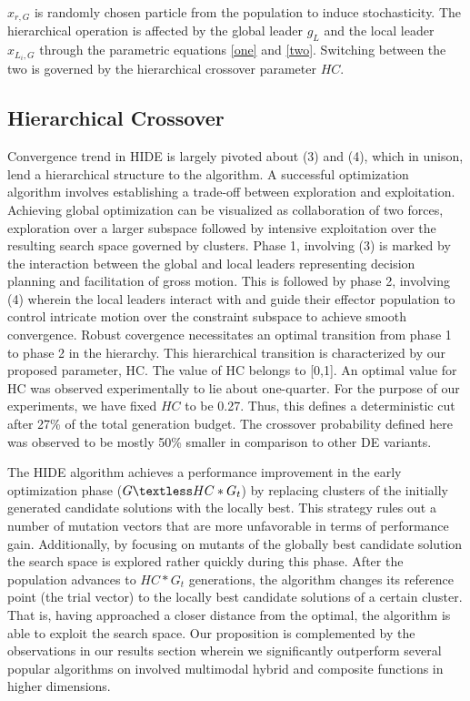 \documentclass[a4paper,twoside]{article}
\begin{document}
$x_{r,G}$ is randomly chosen particle from the population to induce stochasticity. The hierarchical operation is affected by the global leader $g_L$ and the local leader $x_{L_i,G}$  through the parametric equations \eqref{one} and \eqref{two}. Switching between the two is governed by the hierarchical crossover parameter $HC$.


\subsection{Hierarchical Crossover}

Convergence trend in HIDE is largely pivoted about (3) and (4), which in unison, lend a hierarchical structure to the algorithm. A successful optimization algorithm involves establishing a trade-off between exploration and exploitation. Achieving global optimization can be visualized as collaboration of two forces, exploration over a larger subspace followed by intensive exploitation over the resulting search space governed by clusters. Phase 1, involving (3) is marked by the interaction between the global and local leaders representing decision planning and facilitation of gross motion. This is followed by phase 2, involving (4) wherein the local leaders interact with and guide their effector population to control intricate motion over the constraint subspace to achieve smooth convergence. Robust covergence necessitates an optimal transition from phase 1 to phase 2 in the hierarchy. This hierarchical transition is characterized by our proposed parameter, HC. The value of HC belongs to [0,1]. An optimal value for HC was observed experimentally to lie about one-quarter. For the purpose of our experiments, we have fixed $HC$ to be 0.27. Thus, this defines a deterministic cut after 27\% of the total generation budget. The crossover probability defined here was observed to be mostly 50\% smaller in comparison to other DE variants.


The HIDE algorithm achieves a performance improvement in the early optimization phase ($G \textless HC*G_{t}$) by replacing clusters of the initially generated candidate solutions with the locally best. This strategy rules out a number of mutation vectors that are more unfavorable in terms of performance gain. Additionally, by focusing on mutants of the globally best candidate solution the search space is explored rather quickly during this phase. After the population advances to $HC*G_{t}$ generations, the algorithm changes its reference point (the trial vector) to the locally best candidate solutions of a certain cluster. That is, having approached a closer distance from the optimal, the algorithm is able to exploit the search space. Our proposition is complemented by the observations in our results section wherein we significantly outperform several popular algorithms on involved multimodal hybrid and composite functions in higher dimensions.
\end{document}
